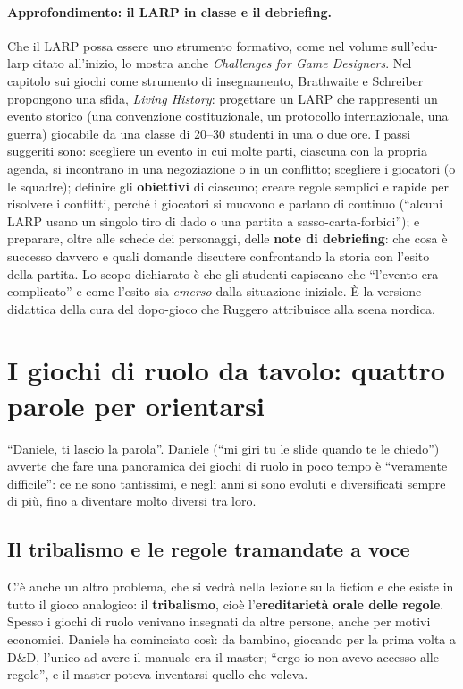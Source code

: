 \paragraph{Approfondimento: il LARP in classe e il debriefing.} Che il LARP
possa essere uno strumento formativo, come nel volume sull'edu-larp citato
all'inizio, lo mostra anche \emph{Challenges for Game Designers}. Nel capitolo
sui giochi come strumento di insegnamento, Brathwaite e Schreiber propongono una
sfida, \emph{Living History}: progettare un LARP che rappresenti un evento storico
(una convenzione costituzionale, un protocollo internazionale, una guerra)
giocabile da una classe di 20--30 studenti in una o due ore. I passi suggeriti
sono: scegliere un evento in cui molte parti, ciascuna con la propria agenda, si
incontrano in una negoziazione o in un conflitto; scegliere i giocatori (o le
squadre); definire gli \textbf{obiettivi} di ciascuno; creare regole semplici e
rapide per risolvere i conflitti, perché i giocatori si muovono e parlano di
continuo (``alcuni LARP usano un singolo tiro di dado o una partita a
sasso-carta-forbici''); e preparare, oltre alle schede dei personaggi, delle
\textbf{note di debriefing}: che cosa è successo davvero e quali domande
discutere confrontando la storia con l'esito della partita. Lo scopo dichiarato è
che gli studenti capiscano che ``l'evento era complicato'' e come l'esito sia
\emph{emerso} dalla situazione iniziale. È la versione didattica della cura del
dopo-gioco che Ruggero attribuisce alla scena nordica.

\section{I giochi di ruolo da tavolo: quattro parole per orientarsi}
\label{a2:sec:gdr}

``Daniele, ti lascio la parola''. Daniele (``mi giri tu le slide quando te le
chiedo'') avverte che fare una panoramica dei giochi di ruolo in poco tempo è
``veramente difficile'': ce ne sono tantissimi, e negli anni si sono evoluti e
diversificati sempre di più, fino a diventare molto diversi tra loro.

\subsection{Il tribalismo e le regole tramandate a voce}

C'è anche un altro problema, che si vedrà nella lezione sulla fiction e che
esiste in tutto il gioco analogico: il \textbf{tribalismo}, cioè
l'\textbf{ereditarietà orale delle regole}. Spesso i giochi di ruolo venivano
insegnati da altre persone, anche per motivi economici. Daniele ha cominciato
così: da bambino, giocando per la prima volta a D\&D, l'unico ad avere il
manuale era il master; ``ergo io non avevo accesso alle regole'', e il master
poteva inventarsi quello che voleva.

